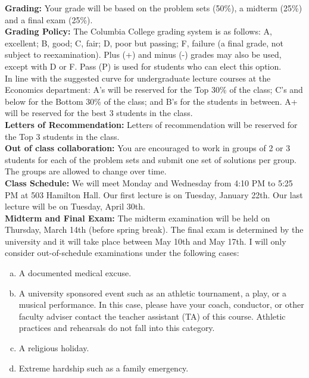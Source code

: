 \documentclass[12pt]{article} %
\numberwithin{equation}{section}
\theoremstyle{definition}
\newcommand{\0}{\textbf{0}}                          %
\begin{document}
\noindent \textbf{Grading:} Your grade will be based on the problem sets (50\%), a midterm (25\%) and a final exam (25\%).\\

\noindent \textbf{Grading Policy:} The Columbia College grading system is as follows: A, excellent; B, good; C, fair; D, poor but passing; F, failure (a final grade, not subject to reexamination). Plus (+) and minus (-) grades may also be used, except with D or F. Pass (P) is used for students who can elect this option.\\

In line with the suggested curve for undergraduate lecture courses at the Economics department: A\textquoteright s will be reserved for the Top 30\% of the class; C\textquoteright s and below for the Bottom 30\% of the class; and B\textquoteright s for the students in between. A+ will be reserved for the best 3 students in the class. \\
 
 \noindent \textbf{Letters of Recommendation:} Letters of recommendation will be reserved for the Top 3 students in the class. \\

\noindent \textbf{Out of class collaboration:} You are encouraged to work in groups of 2 or 3 students for each of the problem sets and submit one set of solutions per group. The groups are allowed to change over time.  \\ 

\noindent \textbf{Class Schedule:} We will meet Monday and Wednesday from 4:10 PM to 5:25 PM at 503 Hamilton Hall. Our first lecture is on Tuesday, January 22th. Our last lecture will be on Tuesday, April 30th.\\


\noindent \textbf{Midterm and Final Exam:}  The midterm examination will be held on Thursday, March 14th (before spring break). The final exam is determined by the university and it will take place between May 10th and May 17th. I will only consider out-of-schedule examinations under the following cases:

\begin{enumerate}[a)]
\item A documented medical excuse.
\item A university sponsored event such as an athletic tournament, a play, or a musical performance. In this case, please have your coach, conductor, or other faculty adviser contact the teacher assistant (TA) of this course. Athletic practices and rehearsals do not fall into this category. 

\item A religious holiday.

\item Extreme hardship such as a family emergency.

\end{enumerate}
\end{document}
